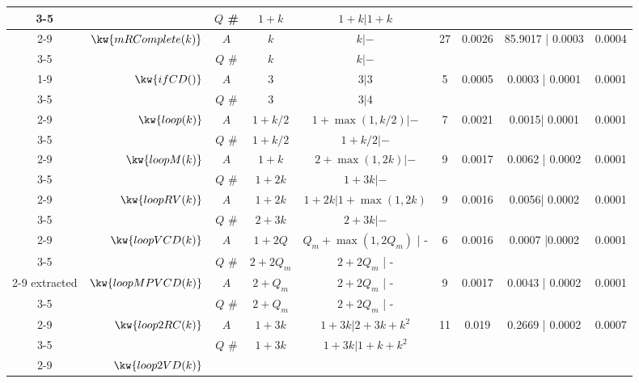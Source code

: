 \begin {table}[H]
\begin{center}
{\begin{tabular}{ | >{\tiny}c| r | >{\tiny}c | c | c | c | c | c | c | }
         \cline{3-5}
         & & $Q$ \#   & $1 + k$ & $1 + k | 1 + k$ & & & & \\
         \cline{2-9}
         & $\kw{mRComplete(k)}$ 
         & $A$ & $k$ & $ k | -  $   &  27 & 0.0026 & 85.9017 | 0.0003 & 0.0004 \\
         \cline{3-5}
         & & $Q$ \#   & $k$ & $k |-$   & & & & \\
         \cline{1-9}
         & $ \kw{ifCD()}$ 
         & $A$ & $3$ & $3 | 3$  & 5 & 0.0005 & 0.0003 | 0.0001  & 0.0001 \\
         \cline{3-5}
         & & $Q$ \#   & 3  &   $3| 4$ & & & & \\
         \cline{2-9}
         & $  \kw{loop(k)}$ 
         & $A$ & $1+k/2$ & $1 +\max(1, k/2) |- $  & 7 & 0.0021 & 0.0015| 0.0001 &  0.0001 \\
         \cline{3-5}
         & & $Q$ \#   &  $1+k/2$ &  $1+k/2 | - $  & & & & \\
         \cline{2-9}
         & $  \kw{loopM(k)}$ 
         & $A$ &  $1 + k$  & $ 2 + \max(1,2k) | -$  &  9 & 0.0017 & 0.0062 | 0.0002 & 0.0001  \\
         \cline{3-5}
         & & $Q$ \#   & $1+2k $ & $1 + 3k | -$  & & & & \\
         \cline{2-9}
         & $  \kw{loopRV(k)}$ 
         & $A$ & $1 + 2k$ &  $1 + 2k| 1 + \max(1,2k)$  &  9 & 0.0016 & 0.0056| 0.0002 & 0.0001  \\
         \cline{3-5}
         & & $Q$ \#   & {$2 + 3 k$} & $2 + 3 k| -$   & & & & \\
         \cline{2-9}
         &  ${\kw{loopVCD(k)}} $ 
         & $A$ & ${1 + 2Q}$ &  ${Q_m+\max(1,2Q_m)}$ | - &  6 & 0.0016 & 0.0007 |0.0002 & 0.0001 \\
         \cline{3-5}
         & & $Q$ \#   &{$2+2Q_m$} & $2+2Q_m$ | -   & & & & \\
         \cline{2-9}
         extracted
         & $ {\kw{loopMPVCD(k)}}$ 
         & $A$ &  $2 + Q_m$ & $2+2Q_m$ | -  &   9 & 0.0017 & 0.0043 | 0.0002 & 0.0001 \\
         \cline{3-5}
         & & $Q$ \#   & $2+Q_m$ & $2+2Q_m$ | - & & & & \\
         \cline{2-9}
         & $\kw{loop2RC(k)}$ 
         & $A$ & $1 + 3k$ &  $1 + 3k | 2 + 3k + k^2$   &  11 & 0.019 & 0.2669 | 0.0002 & 0.0007 \\
         \cline{3-5}
         & & $Q$ \#   & $1 + 3k$ &  $1 + 3k | 1 + k + k^2$ & & & & \\
         \cline{2-9}
         & $\kw{loop2VD(k)}$ 

\end{tabular}}
\end{center}
\end{table}
